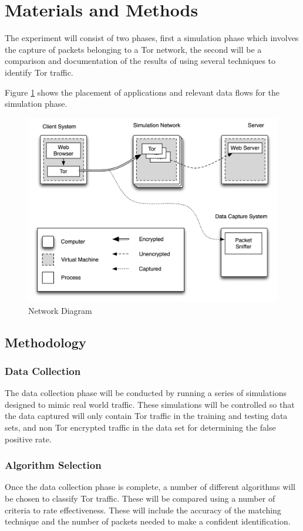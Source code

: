 \documentclass{conference}
\begin{document}
\section{Materials and Methods}

The experiment will consist of two phases, first a simulation phase which involves the capture of packets belonging to a Tor network, the second will be a comparison and documentation of the results of using several techniques to identify Tor traffic.

Figure \ref{network-diagram} shows the placement of applications and relevant data flows for the simulation phase.

\begin{figure}[H]
\center \includegraphics[scale=0.7]{network-diagram}
\caption{Network Diagram}
\label{network-diagram}
\end{figure}

\subsection{Methodology}

\subsubsection{Data Collection}

The data collection phase will be conducted by running a series of simulations designed to mimic real world traffic. These simulations will be controlled so that the data captured will only contain Tor traffic in the training and testing data sets, and non Tor encrypted traffic in the data set for determining the false positive rate.

\subsubsection{Algorithm Selection}

Once the data collection phase is complete, a number of different algorithms will be chosen to classify Tor traffic. These will be compared using a number of criteria to rate effectiveness. These will include the accuracy of the matching technique and the number of packets needed to make a confident identification.


\printbibliography[title=REFERENCES]
\end{document}
